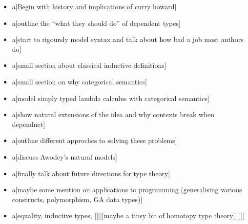 \begin{itemize}
\item a[Begin with history and implications of curry howard]

\item a[outline the ``what they should do'' of dependent types]

\item a[start to rigoursly model syntax and talk about how bad a job most authors do]

\item a[small section about classical inductive definitions]

\item a[small section on why categorical semantics]

\item a[model simply typed lambda calculus with categorical semantics]

\item a[show natural extensions of the idea and why contexts break when dependnet]

\item a[outline different approches to solving these problems]

\item a[discuss Awodey's natural models]

\item a[finally talk about future directions for type theory]

\item a[maybe some mention on applications to programming (generalising various constructs, polymorphism, GA data types)]

\item a[equality, inductive types, [[[[[maybe a tinsy bit of homotopy type theory]]]]]]
\end{itemize}


